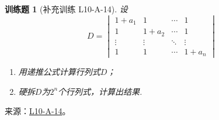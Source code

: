 \documentclass[12pt,fontset=fandol]{ctexart}
\newtheorem{exercise}{训练题}[section]
\begin{document}
\begin{exercise}[补充训练 L10-A-14]\label{prob:L10-A-14}
设
        \[ D=\begin{vmatrix}
                1+a_1  & 1      & \cdots & 1      \\
                1      & 1+a_2  & \cdots & 1      \\
                \vdots & \vdots & \ddots & \vdots \\
                1      & 1      & \cdots & 1+a_n
            \end{vmatrix} \]
        \begin{enumerate}
            \item 用递推公式计算行列式$D$；

            \item 硬拆$D$为$2^n$个行列式，计算出结果.
        \end{enumerate}
\end{exercise}
\noindent 来源：\href{https://github.com/yhwu-is/Linear-Algebra-Left-Undone/blob/new/%E8%AE%B2%E4%B9%89/%E4%B8%93%E9%A2%98/10%20%E8%A1%8C%E5%88%97%E5%BC%8F.tex}{L10-A-14}。
\end{document}
